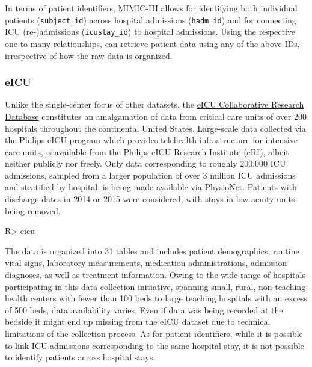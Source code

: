 \documentclass[
  notitle]{jss}
\begin{document}
In terms of patient identifiers, MIMIC-III allows for identifying both
individual patients (\texttt{subject\_id}) across hospital admissions
(\texttt{hadm\_id}) and for connecting ICU (re-)admissions
(\texttt{icustay\_id}) to hospital admissions. Using the respective
one-to-many relationships,  can retrieve patient data using
any of the above IDs, irrespective of how the raw data is organized.

\hypertarget{eicu}{%
\subsubsection{eICU}\label{eicu}}

Unlike the single-center focus of other datasets, the
\href{https://physionet.org/content/eicu-crd/2.0/}{eICU Collaborative
Research Database} constitutes an amalgamation of data from critical
care units of over 200 hospitals throughout the continental United
States. Large-scale data collected via the Philips eICU program which
provides telehealth infrastructure for intensive care units, is
available from the Philips eICU Research Institute (eRI), albeit neither
publicly nor freely. Only data corresponding to roughly 200,000 ICU
admissions, sampled from a larger population of over 3 million ICU
admissions and stratified by hospital, is being made available via
PhysioNet. Patients with discharge dates in 2014 or 2015 were
considered, with stays in low acuity units being removed.

\begin{CodeChunk}
\begin{CodeInput}
R> eicu
\end{CodeInput}
\end{CodeChunk}

The data is organized into 31 tables and includes patient demographics,
routine vital signs, laboratory measurements, medication
administrations, admission diagnoses, as well as treatment information.
Owing to the wide range of hospitals participating in this data
collection initiative, spanning small, rural, non-teaching health
centers with fewer than 100 beds to large teaching hospitals with an
excess of 500 beds, data availability varies. Even if data was being
recorded at the bedside it might end up missing from the eICU dataset
due to technical limitations of the collection process. As for patient
identifiers, while it is possible to link ICU admissions corresponding
to the same hospital stay, it is not possible to identify patients
across hospital stays.
\end{document}
